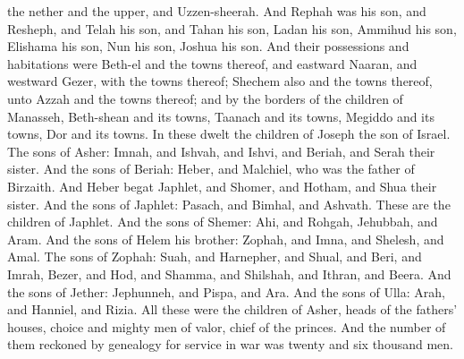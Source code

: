 the nether and the upper, and Uzzen-sheerah. And Rephah was his son, and Resheph, and Telah his son, and Tahan his son, Ladan his son, Ammihud his son, Elishama his son, Nun his son, Joshua his son.  And their possessions and habitations were Beth-el and the towns thereof, and eastward Naaran, and westward Gezer, with the towns thereof; Shechem also and the towns thereof, unto Azzah and the towns thereof; and by the borders of the children of Manasseh, Beth-shean and its towns, Taanach and its towns, Megiddo and its towns, Dor and its towns. In these dwelt the children of Joseph the son of Israel.  The sons of Asher: Imnah, and Ishvah, and Ishvi, and Beriah, and Serah their sister. And the sons of Beriah: Heber, and Malchiel, who was the father of Birzaith. And Heber begat Japhlet, and Shomer, and Hotham, and Shua their sister. And the sons of Japhlet: Pasach, and Bimhal, and Ashvath. These are the children of Japhlet. And the sons of Shemer: Ahi, and Rohgah, Jehubbah, and Aram. And the sons of Helem his brother: Zophah, and Imna, and Shelesh, and Amal. The sons of Zophah: Suah, and Harnepher, and Shual, and Beri, and Imrah, Bezer, and Hod, and Shamma, and Shilshah, and Ithran, and Beera. And the sons of Jether: Jephunneh, and Pispa, and Ara. And the sons of Ulla: Arah, and Hanniel, and Rizia. All these were the children of Asher, heads of the fathers’ houses, choice and mighty men of valor, chief of the princes. And the number of them reckoned by genealogy for service in war was twenty and six thousand men. 

